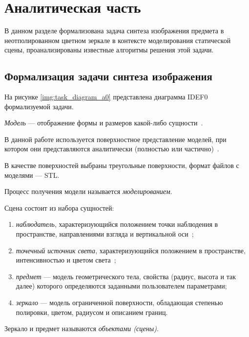 \chapter{Аналитическая часть}

В данном разделе формализована задача синтеза изображения предмета в неотполированном цветном зеркале в контексте моделирования статической сцены, проанализированы известные алгоритмы решения этой задачи.

\section{Формализация задачи синтеза изображения}

На рисунке \ref{img:task_diagram_a0} представлена диаграмма IDEF0 формализуемой задачи.


\textit{Модель} --- отображение формы и размеров какой-либо сущности~\cite{куров}.

В данной работе используется поверхностное представление моделей, при котором они представляются аналитически (полностью или частично)~\cite{куров}.

В качестве поверхностей выбраны треугольные поверхности, формат файлов с моделями --- STL.

Процесс получения модели называется \textit{моделированием}.

Сцена состоит из набора сущностей:
\begin{enumerate}
	\item \textit{наблюдатель}, характеризующийся положением точки наблюдения в пространстве, направлениями взгляда и вертикальной оси~\cite{куров};
	\item \textit{точечный источник света}, характеризующийся положением в пространстве, интенсивностью и цветом света~\cite{куров};
	\item \textit{предмет} --- модель геометрического тела, свойства (радиус, высота и так далее) которого определяются заданными пользователем параметрами;
	\item \textit{зеркало} --- модель ограниченной поверхности, обладающая степенью полировки, цветом, радиусом и описанием границ.
\end{enumerate}

Зеркало и предмет называются \textit{объектами (сцены)}.

